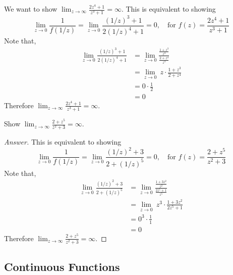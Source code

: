 \begin{example}
We want to show $\displaystyle \lim_{z \to \infty} \frac{2z^4 + 1}{z^3 + 1} = \infty$. This is equivalent to showing
\[\lim_{z \to 0} \frac{1}{f(1/z)} = \lim_{z \to 0} \frac{(1/z)^3 + 1}{2(1/z)^4 + 1} = 0,\quad \text{for }f(z) = \frac{2z^4 + 1}{z^3 + 1}\]
Note that,
\begin{align*}
\lim_{z \to 0} \frac{(1/z)^3 + 1}{2(1/z)^4 + 1}&= \lim_{z \to 0} \frac{\frac{1 + z^3}{z^3}}{\frac{2 + z^4}{z^4}}\\[0.5em]
&= \lim_{z \to 0}\ z\cdot\frac{1 + z^3}{2 + z^4}\\[0.5em]
&= 0\cdot\frac{1}{2}\\[0.5em]
&= 0
\end{align*}
Therefore $\displaystyle \lim_{z \to \infty} \frac{2z^4 + 1}{z^3 + 1} = \infty$.
\end{example}

\medskip

\begin{example}[in-class]
Show $\displaystyle \lim_{z \to \infty} \frac{2 + z^5}{z^2 + 3} = \infty$.
\end{example}
\begin{proof}[Answer]
This is equivalent to showing
\[\lim_{z \to 0} \frac{1}{f(1/z)} = \lim_{z \to 0} \frac{(1/z)^2 + 3}{2 + (1/z)^5} = 0,\quad \text{for }f(z) = \frac{2 + z^5}{z^2 + 3}\]
Note that,
\begin{align*}
\lim_{z \to 0} \frac{(1/z)^2 + 3}{2 + (1/z)^5} &= \lim_{z \to 0} \frac{\frac{1 + 3z^2}{z^2}}{\frac{2z^5 + 1}{z^5}}\\[0.5em]
&= \lim_{z \to 0}\ z^3\cdot\frac{1 + 3z^2}{2z^5 + 1}\\[0.5em]
&= 0^3\cdot\frac{1}{1}\\[0.5em]
&= 0
\end{align*}
Therefore $\displaystyle \lim_{z \to \infty} \frac{2 + z^5}{z^2 + 3} = \infty$.
\end{proof}

\bigskip

\subsection{Continuous Functions}

